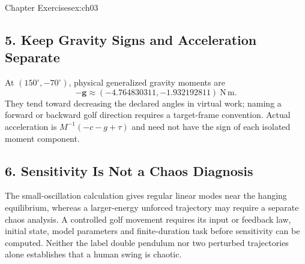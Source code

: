 \begin{exercises}{Chapter Exercises}{ex:ch03}
\subsection*{5. Keep Gravity Signs and Acceleration Separate}
At $(150^\circ,-70^\circ)$, physical generalized gravity moments are
\[
-\bm g\approx(-4.764830311,-1.932192811)\ \mathrm{N\,m}.
\]
 They tend toward decreasing the declared angles in virtual work; naming a forward or backward golf direction requires a target-frame convention. Actual acceleration is $M^{-1}(-c-g+\tau)$ and need not have the sign of each isolated moment component.

\subsection*{6. Sensitivity Is Not a Chaos Diagnosis}
The small-oscillation calculation gives regular linear modes near the hanging equilibrium, whereas a larger-energy unforced trajectory may require a separate chaos analysis. A controlled golf movement requires its input or feedback law, initial state, model parameters and finite-duration task before sensitivity can be computed. Neither the label double pendulum nor two perturbed trajectories alone establishes that a human swing is chaotic.
\end{exercises}

\flushbottom{}
